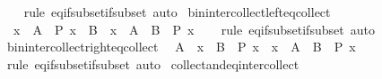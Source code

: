 \begin{isabellebody}
%
\isadelimproof
\ \ %
\endisadelimproof
%
\isatagproof
{}\isamarkupfalse%
\ {\isacharparenleft}{\kern0pt}rule\ eq{\isacharunderscore}{\kern0pt}if{\isacharunderscore}{\kern0pt}subset{\isacharunderscore}{\kern0pt}if{\isacharunderscore}{\kern0pt}subset{\isacharparenright}{\kern0pt}\ auto%
\endisatagproof
{\isafoldproof}%
%
\isadelimproof
\isanewline
%
\endisadelimproof
\isanewline
{}\isamarkupfalse%
\ bin{\isacharunderscore}{\kern0pt}inter{\isacharunderscore}{\kern0pt}collect{\isacharunderscore}{\kern0pt}left{\isacharunderscore}{\kern0pt}eq{\isacharunderscore}{\kern0pt}collect{\isacharcolon}{\kern0pt}\isanewline
\ \ {\isachardoublequoteopen}{\isacharbraceleft}{\kern0pt}x\ {\isasymin}\ A\ {\isacharbar}{\kern0pt}\ P\ x{\isacharbraceright}{\kern0pt}\ {\isasyminter}\ B\ {\isacharequal}{\kern0pt}\ {\isacharbraceleft}{\kern0pt}x\ {\isasymin}\ A\ {\isasyminter}\ B\ {\isacharbar}{\kern0pt}\ P\ x{\isacharbraceright}{\kern0pt}{\isachardoublequoteclose}\isanewline
%
\isadelimproof
\ \ %
\endisadelimproof
%
\isatagproof
{}\isamarkupfalse%
\ {\isacharparenleft}{\kern0pt}rule\ eq{\isacharunderscore}{\kern0pt}if{\isacharunderscore}{\kern0pt}subset{\isacharunderscore}{\kern0pt}if{\isacharunderscore}{\kern0pt}subset{\isacharparenright}{\kern0pt}\ auto%
\endisatagproof
{\isafoldproof}%
%
\isadelimproof
\isanewline
%
\endisadelimproof
\isanewline
{}\isamarkupfalse%
\ bin{\isacharunderscore}{\kern0pt}inter{\isacharunderscore}{\kern0pt}collect{\isacharunderscore}{\kern0pt}right{\isacharunderscore}{\kern0pt}eq{\isacharunderscore}{\kern0pt}collect{\isacharcolon}{\kern0pt}\isanewline
\ \ {\isachardoublequoteopen}A\ {\isasyminter}\ {\isacharbraceleft}{\kern0pt}x\ {\isasymin}\ B\ {\isacharbar}{\kern0pt}\ P\ x{\isacharbraceright}{\kern0pt}\ {\isacharequal}{\kern0pt}\ {\isacharbraceleft}{\kern0pt}x\ {\isasymin}\ A\ {\isasyminter}\ B\ {\isacharbar}{\kern0pt}\ P\ x{\isacharbraceright}{\kern0pt}{\isachardoublequoteclose}\isanewline
%
\isadelimproof
\ \ %
\endisadelimproof
%
\isatagproof
{}\isamarkupfalse%
\ {\isacharparenleft}{\kern0pt}rule\ eq{\isacharunderscore}{\kern0pt}if{\isacharunderscore}{\kern0pt}subset{\isacharunderscore}{\kern0pt}if{\isacharunderscore}{\kern0pt}subset{\isacharparenright}{\kern0pt}\ auto%
\endisatagproof
{\isafoldproof}%
%
\isadelimproof
\isanewline
%
\endisadelimproof
\isanewline
{}\isamarkupfalse%
\ collect{\isacharunderscore}{\kern0pt}and{\isacharunderscore}{\kern0pt}eq{\isacharunderscore}{\kern0pt}inter{\isacharunderscore}{\kern0pt}collect{\isacharcolon}{\kern0pt}\isanewline

\end{isabellebody}
